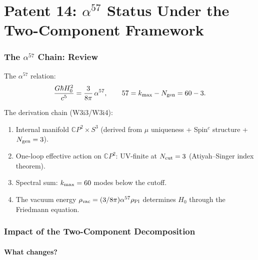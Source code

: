 \documentclass[11pt]{article}
\newcommand{\Hzero}{H_0}
\newcommand{\mufd}{\mu}
\newcommand{\CP}{\mathbb{C}P}
\begin{document}
\newpage
\part{Patent 14: $\alpha^{57}$ Status Under the Two-Component Framework}
\label{part:alpha57}

\section{The $\alpha^{57}$ Chain: Review}
\label{sec:alpha57-review}

The $\alpha^{57}$ relation:
\begin{equation}
\frac{G\hbar\Hzero^2}{c^5} = \frac{3}{8\pi}\,\alpha^{57},
\qquad 57 = k_{\rm max} - N_{\rm gen} = 60 - 3.
\label{eq:alpha57}
\end{equation}

The derivation chain (W3i3/W3i4):
\begin{enumerate}[nosep]
\item Internal manifold $\CP^2 \times S^3$ (derived from $\mufd$
  uniqueness + Spin$^c$ structure + $N_{\rm gen} = 3$).
\item One-loop effective action on $\CP^2$: UV-finite at $N_{\rm cut} = 3$
  (Atiyah--Singer index theorem).
\item Spectral sum: $k_{\rm max} = 60$ modes below the cutoff.
\item The vacuum energy $\rho_{\rm vac} = (3/8\pi)\alpha^{57}\rho_{\rm Pl}$
  determines $\Hzero$ through the Friedmann equation.
\end{enumerate}

\section{Impact of the Two-Component Decomposition}
\label{sec:alpha57-twocomp}

\subsection{What changes?}
\end{document}
